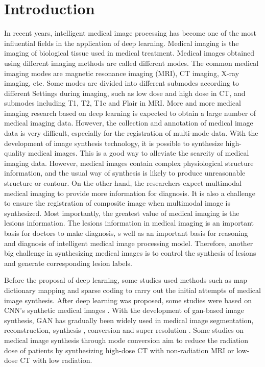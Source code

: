 \documentclass[runningheads]{llncs}
\begin{document}
\section{Introduction}
In recent years, intelligent medical image processing has become one of the most influential fields in the application of deep learning. Medical imaging is the imaging of biological tissue used in medical treatment. Medical images obtained using different imaging methods are called different modes. The common medical imaging modes are magnetic resonance imaging (MRI), CT imaging, X-ray imaging, etc. Some modes are divided into different submodes according to different Settings during imaging, such as low dose and high dose in CT, and submodes including T1, T2, T1c and Flair in MRI.
More and more medical imaging research based on deep learning is expected to obtain a large number of medical imaging data. However, the collection and annotation of medical image data is very difficult, especially for the registration of multi-mode data. With the development of image synthesis technology, it is possible to synthesize high-quality medical images. This is a good way to alleviate the scarcity of medical imaging data.
However, medical images contain complex physiological structure information, and the usual way of synthesis is likely to produce unreasonable structure or contour. On the other hand, the researchers expect multimodal medical imaging to provide more information for diagnosis. It is also a challenge to ensure the registration of composite image when multimodal image is synthesized.
Most importantly, the greatest value of medical imaging is the lesions information. The lesions information in medical imaging is an important basis for doctors to make diagnosis, s well as an important basis for reasoning and diagnosis of intelligent medical image processing model. Therefore, another big challenge in synthesizing medical images is to control the synthesis of lesions and generate corresponding lesion labels.


Before the proposal of deep learning, some studies used methods such as map dictionary mapping\cite{22burgos2015robust} and sparse coding\cite{33huang2017simultaneous,34vemulapalli2015unsupervised} to carry out the initial attempts of medical image synthesis. After deep learning was proposed, some studies were based on CNN's synthetic medical images \cite{66miao2018dilated,36vannguyen2015crossdomain}. With the development of gan-based image synthesis, GAN has gradually been widely used in medical image segmentation\cite{40kamnitsas2017unsupervised}, reconstruction\cite{61fan2018a,65anirudh2018lose}, synthesis \cite{4shin2018medical,41costa2017towards,43iglesias2013is,44shrivastava2017learning}, conversion \cite{2zhang2018translating,20nie2017medical,35osokin2017gans,36vannguyen2015crossdomain,40kamnitsas2017unsupervised,136yi2018sharpness-aware,137yang2018low-dose,138WolterinkGenerative} and super resolution \cite{14You2018CT,15lyu2018super-resolution}. Some studies on medical image synthesis through mode conversion aim to reduce the radiation dose of patients by synthesizing high-dose CT with non-radiation MRI or low-dose CT with low radiation\cite{2zhang2018translating,20nie2017medical,136yi2018sharpness-aware,137yang2018low-dose,138WolterinkGenerative}.
\end{document}
